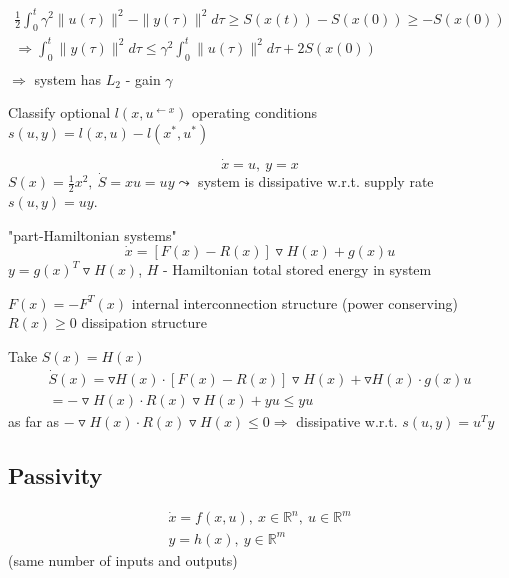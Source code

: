 \begin{equation*}
\begin{split}
\frac{1}{2} \int_0^t \gamma^2 \|u(\tau)\|^2 - \|y(\tau)\|^2d\tau \geq S(x(t)) - S(x(0)) \geq -S(x(0)) \\
\Rightarrow \int_0^t \|y(\tau)\|^2d\tau \leq \gamma^2 \int_0^t \|u(\tau)\|^2d\tau + 2 S(x(0)) \\
\end{split}
\end{equation*}
$\Rightarrow$ system has $L_2$ - gain $\gamma$

Classify optional $l(x,u^{\leftarrow x})$ operating conditions $s(u,y) = l(x,u) - l(x^*,u^*)$ 

\begin{Example}
\begin{equation*}
\dot{x} = u, \ y = x 
\end{equation*}
$S(x) = \frac{1}{2}x^2, \ \dot{S} = xu = uy \leadsto $ system is dissipative w.r.t. supply rate $s(u,y) = uy$.
\end{Example}

\begin{Example}
"part-Hamiltonian systems" 
\begin{equation*}
\dot{x} = [F(x) - R(x)] \triangledown H(x) + g(x)u
\end{equation*}
$y = g(x)^T\triangledown H(x)$, $H$ - Hamiltonian total stored energy in system

$F(x) = -F^T(x)$ internal interconnection structure (power conserving) $R(x) \geq 0$ dissipation structure

Take $S(x) = H(x)$
\begin{equation*}
\begin{split}
\dot{S}(x) = \triangledown H(x) \cdot [F(x) -R(x)]\triangledown H(x) + \triangledown H(x) \cdot g(x)u \\
= - \triangledown H(x) \cdot R(x) \triangledown H(x) + yu \leq yu 
\end{split}
\end{equation*}
as far as $- \triangledown H(x) \cdot R(x) \triangledown H(x) \leq 0 \Rightarrow$ dissipative w.r.t. $s(u,y) = u^Ty$   
\end{Example}

\subsection{Passivity}

\begin{equation}\label{passivity_system}
\begin{split}
\dot{x} = f(x,u), \ x \in \mathbb{R}^n, \ u \in \mathbb{R}^m \\
y = h(x), \ y \in \mathbb{R}^m
\end{split}
\end{equation}
(same number of inputs and outputs)

